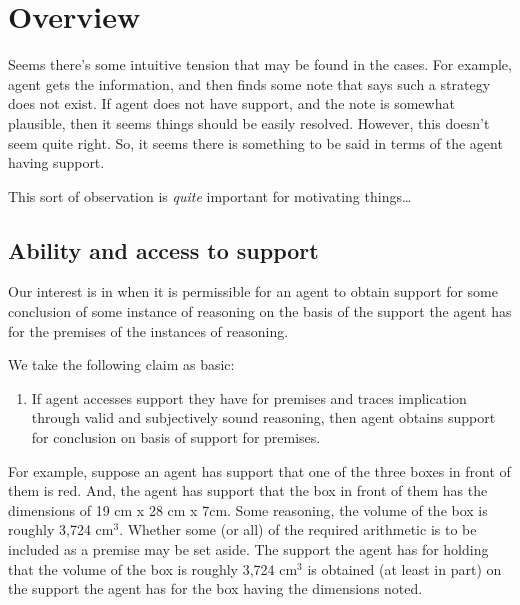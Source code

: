 
\chapter{Overview}
\label{cha:overview}

{
  \begin{note}[To add]
    Seems there's some intuitive tension that may be found in the cases.
    For example, agent gets the information, and then finds some note that says such a strategy does not exist.
    If agent does not have support, and the note is somewhat plausible, then it seems things should be easily resolved.
    However, this doesn't seem quite right.
    So, it seems there is something to be said in terms of the agent having support.

    This sort of observation is \emph{quite} important for motivating things\dots
  \end{note}
}

\section{Ability and access to support}
\label{sec:abil-access-supp}

\begin{note}
  Our interest is in when it is permissible for an agent to obtain support for some conclusion of some instance of reasoning on the basis of the support the agent has for the premises of the instances of reasoning.

  We take the following claim as basic:
  \begin{enumerate}[label=\bP{}, ref=\bP{}]
  \item\label{prem:bP} If agent accesses support they have for premises and traces implication through valid and subjectively sound reasoning, then agent obtains support for conclusion on basis of support for premises.
  \end{enumerate}
  For example, suppose an agent has support that one of the three boxes in front of them is red.
  And, the agent has support that the box in front of them has the dimensions of 19 cm x 28 cm x 7cm.
  Some reasoning, the volume of the box is roughly 3,724 cm\(^{3}\).
  Whether some (or all) of the required arithmetic is to be included as a premise may be set aside.
  The support the agent has for holding that the volume of the box is roughly 3,724 cm\(^{3}\) is obtained (at least in part) on the support the agent has for the box having the dimensions noted.
\end{note}

